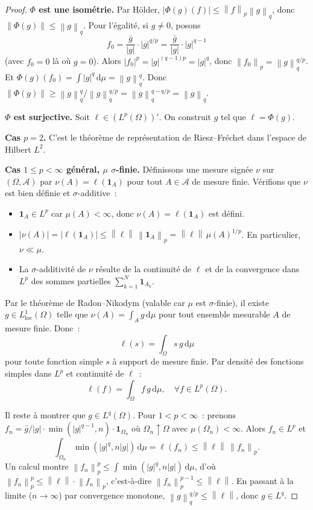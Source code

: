 \documentclass[a4paper,12pt]{book}
\newcommand{\dd}{\mathrm{d}}
\newcommand{\norm}[1]{\left\| #1 \right\|}
\newcommand{\abs}[1]{\left| #1 \right|}
\theoremstyle{definition}
\theoremstyle{plain}
\theoremstyle{remark}
\begin{document}
\begin{proof}
\textbf{$\Phi$ est une isométrie.} Par Hölder, $\abs{\Phi(g)(f)} \le \norm{f}_p\norm{g}_q$,
donc $\norm{\Phi(g)} \le \norm{g}_q$. Pour l'égalité, si $g \neq 0$, posons
\[
  f_0 = \frac{\bar g}{\abs{g}} \cdot \abs{g}^{q/p}
    = \frac{\bar g}{\abs{g}} \cdot \abs{g}^{q-1}
\]
(avec $f_0 = 0$ là où $g = 0$). Alors $\abs{f_0}^p = \abs{g}^{(q-1)p} = \abs{g}^q$,
donc $\norm{f_0}_p = \norm{g}_q^{q/p}$. Et
$\Phi(g)(f_0) = \int \abs{g}^q\,\dd\mu = \norm{g}_q^q$. Donc
$\norm{\Phi(g)} \ge \norm{g}_q^q / \norm{g}_q^{q/p} = \norm{g}_q^{q - q/p} = \norm{g}_q$.

\textbf{$\Phi$ est surjective.} Soit $\ell \in (L^p(\Omega))'$. On construit $g$ tel que
$\ell = \Phi(g)$.

\textbf{Cas $p = 2$.} C'est le théorème de représentation de Riesz--Fréchet dans l'espace
de Hilbert $L^2$.

\textbf{Cas $1 \le p < \infty$ général, $\mu$ $\sigma$-finie.}
Définissons une mesure signée $\nu$ sur $(\Omega, \mathcal{A})$ par
$\nu(A) = \ell(\mathbf{1}_A)$ pour tout $A \in \mathcal{A}$ de mesure finie. Vérifions
que $\nu$ est bien définie et $\sigma$-additive~:
\begin{itemize}
  \item $\mathbf{1}_A \in L^p$ car $\mu(A) < \infty$, donc $\nu(A) = \ell(\mathbf{1}_A)$ est défini.
  \item $\abs{\nu(A)} = \abs{\ell(\mathbf{1}_A)} \le \norm{\ell}\,\norm{\mathbf{1}_A}_p = \norm{\ell}\,\mu(A)^{1/p}$. En particulier, $\nu \ll \mu$.
  \item La $\sigma$-additivité de $\nu$ résulte de la continuité de $\ell$ et de la
        convergence dans $L^p$ des sommes partielles $\sum_{k=1}^N \mathbf{1}_{A_k}$.
\end{itemize}

Par le théorème de Radon--Nikodym (valable car $\mu$ est
$\sigma$-finie), il existe $g \in L^1_{\mathrm{loc}}(\Omega)$ telle que
$\nu(A) = \int_A g\,\dd\mu$ pour tout ensemble mesurable $A$ de mesure finie. Donc~:
\[
  \ell(s) = \int_\Omega s\, g\,\dd\mu
\]
pour toute fonction simple $s$ à support de mesure finie. Par densité des fonctions
simples dans $L^p$ et continuité de $\ell$~:
\[
  \ell(f) = \int_\Omega f\,g\,\dd\mu, \quad \forall f \in L^p(\Omega).
\]

Il reste à montrer que $g \in L^q(\Omega)$. Pour $1 < p < \infty$~: prenons
$f_n = \bar g / \abs{g} \cdot \min(\abs{g}^{q-1}, n) \cdot \mathbf{1}_{\Omega_n}$ où
$\Omega_n \uparrow \Omega$ avec $\mu(\Omega_n) < \infty$. Alors $f_n \in L^p$ et
\[
  \int_{\Omega_n} \min(\abs{g}^q, n\abs{g})\,\dd\mu = \ell(f_n) \le \norm{\ell}\,\norm{f_n}_p.
\]
Un calcul montre $\norm{f_n}_p^p \le \int \min(\abs{g}^q, n\abs{g})\,\dd\mu$, d'où
$\norm{f_n}_p^{p} \le \norm{\ell} \cdot \norm{f_n}_p$, c'est-à-dire
$\norm{f_n}_p^{p-1} \le \norm{\ell}$. En passant à la limite ($n \to \infty$) par
convergence monotone, $\norm{g}_q^{q/p} \le \norm{\ell}$, donc $g \in L^q$.


\end{proof}
\end{document}
